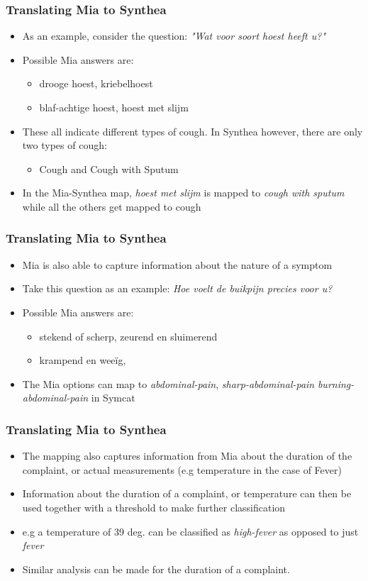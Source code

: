 \documentclass{beamer}
\begin{document}
\frametitle{Translating Mia to Synthea }
\begin{frame}
\begin{itemize}
	\item As an example, consider the question: \textit{"Wat voor soort hoest heeft u?"}
	\item Possible Mia answers are:
	\begin{itemize}
		\item drooge hoest, kriebelhoest
		\item blaf-achtige hoest, hoest met slijm
	\end{itemize}
	\item These all indicate different types of cough. In Synthea however, there are only two types of cough:
	\begin{itemize}
		\item Cough and Cough with Sputum
	\end{itemize}
	\item In the Mia-Synthea map, \textit{hoest met slijm} is mapped to \textit{cough with sputum} while all the others get mapped to cough
\end{itemize}
\end{frame}

\frametitle{Translating Mia to Synthea }
\begin{frame}
\begin{itemize}
	\item Mia is also able to capture information about the nature of a symptom
	\item Take this question as an example: \textit{Hoe voelt de buikpijn precies voor u?}
	\item Possible Mia answers are:
	\begin{itemize}
		\item stekend of scherp, zeurend en sluimerend
		\item krampend en weeïg, 
	\end{itemize}
	\item The Mia options can map to \textit{abdominal-pain}, \textit{sharp-abdominal-pain} \textit{burning-abdominal-pain} in Symcat
\end{itemize}
\end{frame}

\frametitle{Translating Mia to Synthea }
\begin{frame}
\begin{itemize}
	\item The mapping also captures information from Mia about the duration of the complaint, or actual measurements (e.g temperature in the case of Fever)
	\item Information about the duration of a complaint, or temperature can then be used together with a threshold to make further classification
	\item e.g a temperature of 39 deg. can be classified as \textit{high-fever} as opposed to just \textit{fever}
	\item Similar analysis can be made for the duration of a complaint.
\end{itemize}
\end{frame}
\end{document}
